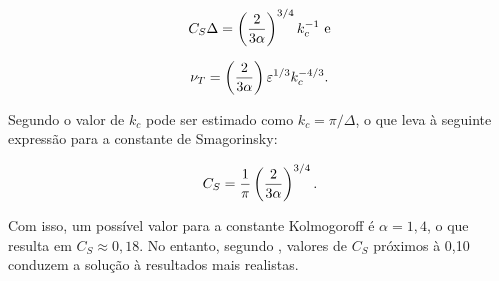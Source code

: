 \begin{equation}
    C_S\Delta=\left({\frac{2}{3\alpha}}\right)^{3/4}k_c^{-1}\text{ e}
\end{equation}

\begin{equation}
    \nu_T=\left({\frac{2}{3\alpha}}\right)\varepsilon^{1/3}k_c^{-4/3}\text{.}
\end{equation}

Segundo  o valor de $k_c$ pode ser estimado como $k_c=\pi/\Delta$, o que leva à seguinte expressão para a constante de Smagorinsky:

\begin{equation}
    C_S=\frac{1}{\pi}\left({\frac{2}{3\alpha}}\right)^{3/4}\text{.}
\end{equation}

Com isso, um possível valor para a constante Kolmogoroff é $\alpha=1,4$, o que resulta em $C_S\approx0,18$. No entanto, segundo  , valores de $C_S$ próximos à 0,10 conduzem a solução à resultados mais realistas.

